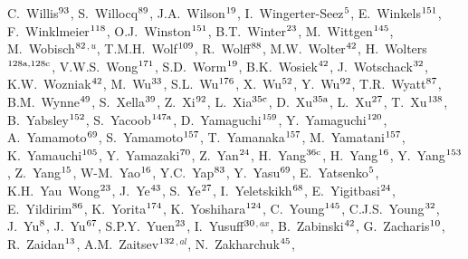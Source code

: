 \begin{flushleft}
C.~Willis$^\textrm{\scriptsize 93}$,
S.~Willocq$^\textrm{\scriptsize 89}$,
J.A.~Wilson$^\textrm{\scriptsize 19}$,
I.~Wingerter-Seez$^\textrm{\scriptsize 5}$,
E.~Winkels$^\textrm{\scriptsize 151}$,
F.~Winklmeier$^\textrm{\scriptsize 118}$,
O.J.~Winston$^\textrm{\scriptsize 151}$,
B.T.~Winter$^\textrm{\scriptsize 23}$,
M.~Wittgen$^\textrm{\scriptsize 145}$,
M.~Wobisch$^\textrm{\scriptsize 82}$$^{,u}$,
T.M.H.~Wolf$^\textrm{\scriptsize 109}$,
R.~Wolff$^\textrm{\scriptsize 88}$,
M.W.~Wolter$^\textrm{\scriptsize 42}$,
H.~Wolters$^\textrm{\scriptsize 128a,128c}$,
V.W.S.~Wong$^\textrm{\scriptsize 171}$,
S.D.~Worm$^\textrm{\scriptsize 19}$,
B.K.~Wosiek$^\textrm{\scriptsize 42}$,
J.~Wotschack$^\textrm{\scriptsize 32}$,
K.W.~Wozniak$^\textrm{\scriptsize 42}$,
M.~Wu$^\textrm{\scriptsize 33}$,
S.L.~Wu$^\textrm{\scriptsize 176}$,
X.~Wu$^\textrm{\scriptsize 52}$,
Y.~Wu$^\textrm{\scriptsize 92}$,
T.R.~Wyatt$^\textrm{\scriptsize 87}$,
B.M.~Wynne$^\textrm{\scriptsize 49}$,
S.~Xella$^\textrm{\scriptsize 39}$,
Z.~Xi$^\textrm{\scriptsize 92}$,
L.~Xia$^\textrm{\scriptsize 35c}$,
D.~Xu$^\textrm{\scriptsize 35a}$,
L.~Xu$^\textrm{\scriptsize 27}$,
T.~Xu$^\textrm{\scriptsize 138}$,
B.~Yabsley$^\textrm{\scriptsize 152}$,
S.~Yacoob$^\textrm{\scriptsize 147a}$,
D.~Yamaguchi$^\textrm{\scriptsize 159}$,
Y.~Yamaguchi$^\textrm{\scriptsize 120}$,
A.~Yamamoto$^\textrm{\scriptsize 69}$,
S.~Yamamoto$^\textrm{\scriptsize 157}$,
T.~Yamanaka$^\textrm{\scriptsize 157}$,
M.~Yamatani$^\textrm{\scriptsize 157}$,
K.~Yamauchi$^\textrm{\scriptsize 105}$,
Y.~Yamazaki$^\textrm{\scriptsize 70}$,
Z.~Yan$^\textrm{\scriptsize 24}$,
H.~Yang$^\textrm{\scriptsize 36c}$,
H.~Yang$^\textrm{\scriptsize 16}$,
Y.~Yang$^\textrm{\scriptsize 153}$,
Z.~Yang$^\textrm{\scriptsize 15}$,
W-M.~Yao$^\textrm{\scriptsize 16}$,
Y.C.~Yap$^\textrm{\scriptsize 83}$,
Y.~Yasu$^\textrm{\scriptsize 69}$,
E.~Yatsenko$^\textrm{\scriptsize 5}$,
K.H.~Yau~Wong$^\textrm{\scriptsize 23}$,
J.~Ye$^\textrm{\scriptsize 43}$,
S.~Ye$^\textrm{\scriptsize 27}$,
I.~Yeletskikh$^\textrm{\scriptsize 68}$,
E.~Yigitbasi$^\textrm{\scriptsize 24}$,
E.~Yildirim$^\textrm{\scriptsize 86}$,
K.~Yorita$^\textrm{\scriptsize 174}$,
K.~Yoshihara$^\textrm{\scriptsize 124}$,
C.~Young$^\textrm{\scriptsize 145}$,
C.J.S.~Young$^\textrm{\scriptsize 32}$,
J.~Yu$^\textrm{\scriptsize 8}$,
J.~Yu$^\textrm{\scriptsize 67}$,
S.P.Y.~Yuen$^\textrm{\scriptsize 23}$,
I.~Yusuff$^\textrm{\scriptsize 30}$$^{,ax}$,
B.~Zabinski$^\textrm{\scriptsize 42}$,
G.~Zacharis$^\textrm{\scriptsize 10}$,
R.~Zaidan$^\textrm{\scriptsize 13}$,
A.M.~Zaitsev$^\textrm{\scriptsize 132}$$^{,al}$,
N.~Zakharchuk$^\textrm{\scriptsize 45}$,
$$
\end{flushleft}
